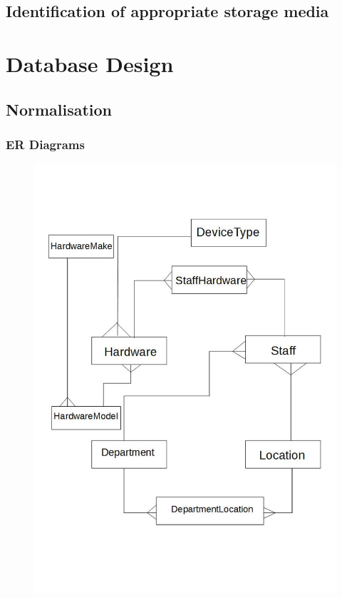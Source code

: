 \subsection{Identification of appropriate storage media}

\section{Database Design}

\subsection{Normalisation}

\newpage

\subsubsection{ER Diagrams}

\begin{figure}[H]
\includegraphics[width=\textwidth]{ERNormalisedDiagram.jpg}
\end{figure}


